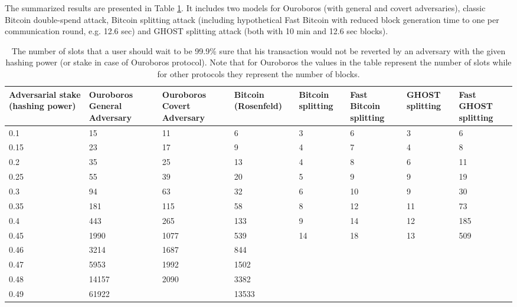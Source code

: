 \documentclass[10pt,a4paper]{article}
\numberwithin{equation}{section} %
\theoremstyle{plain}
\theoremstyle{definition}
\theoremstyle{remark}
\begin{document}
	The summarized results are presented in Table \ref{tbl:fork_lengths_comparison}. It includes two models for Ouroboros (with general and covert adversaries), classic Bitcoin double-spend attack, Bitcoin splitting attack (including hypothetical Fast Bitcoin with reduced block generation time to one per communication round, e.g. 12.6 sec) and GHOST splitting attack (both with 10 min and 12.6 sec blocks).
	
	\begin{table}[h!]
        \label{tbl:fork_lengths_comparison}
        \centering
        \begin{tabular}{|p{2cm}||p{1.5cm}|p{1.5cm}|p{1.2cm}|p{1.2cm}|p{1.5cm}|p{1.2cm}|p{1.2cm}|}
             \hline 
             Adversarial stake (hashing power) & Ouroboros General Adversary & Ouroboros Covert Adversary & Bitcoin (Rosenfeld) & Bitcoin splitting & Fast Bitcoin splitting & GHOST splitting & Fast GHOST splitting \\
             \hline
             0.1   & 15     & 11     & 6    & 3  & 6  & 3   & 6     \\
             0.15  & 23     & 17    & 9     & 4  & 7  & 4   & 8     \\
             0.2   & 35     & 25    & 13    & 4  & 8  & 6   & 11    \\
             0.25  & 55     & 39    & 20    & 5  & 9  & 9   & 19    \\
             0.3   & 94     & 63    & 32    & 6  & 10 & 9   & 30    \\
             0.35  & 181    & 115   & 58    & 8  & 12 & 11  & 73    \\
             0.4   & 443    & 265   & 133   & 9  & 14 & 12  & 185   \\
             0.45  & 1990   & 1077  & 539   & 14 & 18 & 13  & 509   \\
             0.46  & 3214   & 1687  & 844   &    &    &     &       \\
             0.47  & 5953   & 1992  & 1502  &    &    &     &       \\
             0.48  & 14157  & 2090  & 3382  &    &    &     &       \\
             0.49  & 61922  &       & 13533 &    &    &     &       \\
             \hline
        \end{tabular}
        \caption{The number of slots that a user should wait to be 99.9\% sure that his transaction would not be reverted by an adversary with the given hashing power (or stake in case of Ouroboros protocol). Note that for Ouroboros the values in the table represent the number of slots while for other protocols they represent the number of blocks.}
    \end{table}
    
\end{document}
